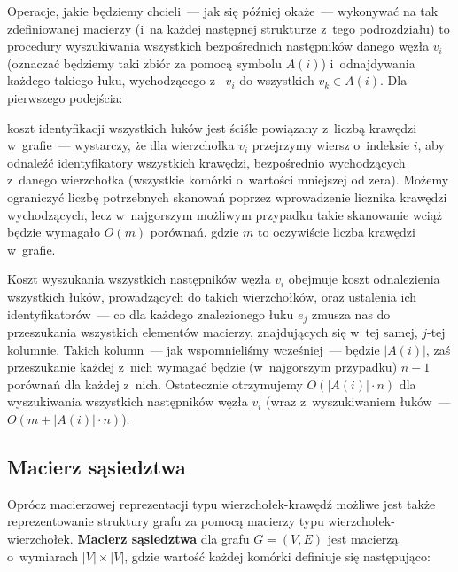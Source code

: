 Operacje, jakie będziemy chcieli~---  jak się później okaże~---  wykonywać na tak zdefiniowanej macierzy (i~na każdej następnej strukturze z~tego podrozdziału) to procedury wyszukiwania wszystkich bezpośrednich następników danego węzła $v_{i}$ (oznaczać będziemy taki zbiór za pomocą symbolu $A \left( i \right) $) i~odnajdywania każdego takiego łuku, wychodzącego z~ $v_{i}$ do wszystkich $v_{k} \in A \left( i \right) $.
Dla pierwszego podejścia:

\begin{myitemize}
	\item koszt identyfikacji wszystkich łuków jest ściśle powiązany z~liczbą krawędzi w~grafie~---  wystarczy, że dla wierzchołka $v_{i}$ przejrzymy wiersz o~indeksie $i$, aby odnaleźć identyfikatory wszystkich krawędzi, bezpośrednio wychodzących z~danego wierzchołka (wszystkie komórki o~wartości mniejszej od zera). Możemy ograniczyć liczbę potrzebnych skanowań poprzez wprowadzenie licznika krawędzi wychodzących, lecz w~najgorszym możliwym przypadku takie skanowanie wciąż będzie wymagało $O \left( m \right)$ porównań, gdzie $m$ to oczywiście liczba krawędzi w~grafie.
	\item Koszt wyszukania wszystkich następników węzła $v_{i}$ obejmuje koszt odnalezienia wszystkich łuków, prowadzących do takich wierzchołków, oraz ustalenia ich identyfikatorów~---  co dla każdego znalezionego łuku $e_{j}$ zmusza nas do przeszukania wszystkich elementów macierzy, znajdujących się w~tej samej, $j$-tej kolumnie. Takich kolumn~---  jak wspomnieliśmy wcześniej~---  będzie $ \left| A \left( i \right) \right| $, zaś przeszukanie każdej z~nich wymagać będzie (w~najgorszym przypadku) $n-1$ porównań dla każdej z~nich. Ostatecznie otrzymujemy $O \left( \left| A \left( i \right) \right| \cdot n \right)$ dla wyszukiwania wszystkich następników węzła $v_{i}$ (wraz z~wyszukiwaniem łuków~---  $O \left( m + \left| A \left( i \right) \right| \cdot n \right)$).
\end{myitemize}

\subsection{Macierz sąsiedztwa}

Oprócz macierzowej reprezentacji typu wierzchołek-krawędź możliwe jest także reprezentowanie struktury grafu za pomocą macierzy typu wierzchołek-wierzchołek. \textbf{Macierz sąsiedztwa} dla grafu $G = \left( V, E \right) $ jest macierzą o~wymiarach $\left| V \right| \times \left| V \right|$, gdzie wartość każdej komórki definiuje się następująco:

